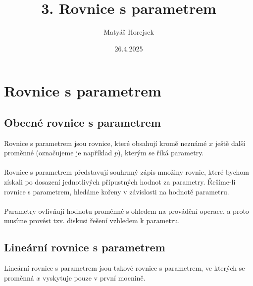 \title{3. Rovnice s parametrem}
\author{Matyáš Horejsek}
\date{26.4.2025}

\maketitle



\section{Rovnice s parametrem}
    \subsection{Obecné rovnice s parametrem}
Rovnice s parametrem jsou rovnice, které obsahují kromě neznámé $x$ ještě další proměnné (označujeme je například $p$), kterým se říká parametry.\\\\
Rovnice s parametrem představují souhrnný zápis množiny rovnic, které bychom získali po dosazení jednotlivých přípustných hodnot za parametry. Řešíme-li rovnice s parametrem, hledáme kořeny v závislosti na hodnotě parametru.\\\\
Parametry ovlivňují hodnotu proměnné s ohledem na provádění operace, a proto musíme provést tzv. diskusi řešení vzhledem k parametru.
    \subsection{Lineární rovnice s parametrem}
Lineární rovnice s parametrem jsou takové rovnice s parametrem, ve kterých se proměnná $x$ vyskytuje pouze v první mocnině.

